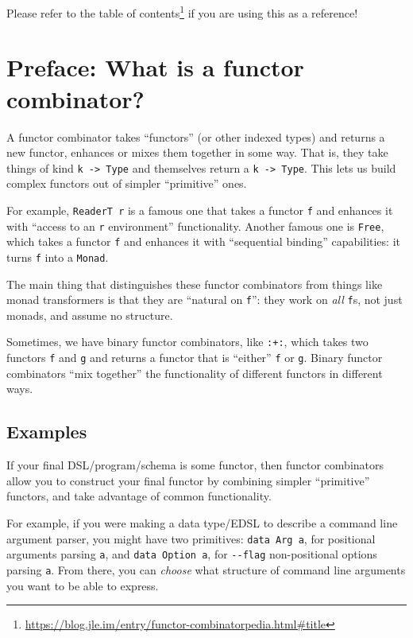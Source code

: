 \documentclass[]{article}
\renewcommand{\href}[2]{#2\footnote{\url{#1}}}
\begin{document}
Please refer to the
\href{https://blog.jle.im/entry/functor-combinatorpedia.html\#title}{table of
contents} if you are using this as a reference!

\hypertarget{preface-what-is-a-functor-combinator}{%
\section{Preface: What is a functor
combinator?}\label{preface-what-is-a-functor-combinator}}

A functor combinator takes ``functors'' (or other indexed types) and returns a
new functor, enhances or mixes them together in some way. That is, they take
things of kind \texttt{k\ -\textgreater{}\ Type} and themselves return a
\texttt{k\ -\textgreater{}\ Type}. This lets us build complex functors out of
simpler ``primitive'' ones.

For example, \texttt{ReaderT\ r} is a famous one that takes a functor \texttt{f}
and enhances it with ``access to an \texttt{r} environment'' functionality.
Another famous one is \texttt{Free}, which takes a functor \texttt{f} and
enhances it with ``sequential binding'' capabilities: it turns \texttt{f} into a
\texttt{Monad}.

The main thing that distinguishes these functor combinators from things like
monad transformers is that they are ``natural on \texttt{f}'': they work on
\emph{all} \texttt{f}s, not just monads, and assume no structure.

Sometimes, we have binary functor combinators, like \texttt{:+:}, which takes
two functors \texttt{f} and \texttt{g} and returns a functor that is ``either''
\texttt{f} or \texttt{g}. Binary functor combinators ``mix together'' the
functionality of different functors in different ways.

\hypertarget{examples}{%
\subsection{Examples}\label{examples}}

If your final DSL/program/schema is some functor, then functor combinators allow
you to construct your final functor by combining simpler ``primitive'' functors,
and take advantage of common functionality.

For example, if you were making a data type/EDSL to describe a command line
argument parser, you might have two primitives: \texttt{data\ Arg\ a}, for
positional arguments parsing \texttt{a}, and \texttt{data\ Option\ a}, for
\texttt{-\/-flag} non-positional options parsing \texttt{a}. From there, you can
\emph{choose} what structure of command line arguments you want to be able to
express.
\end{document}
